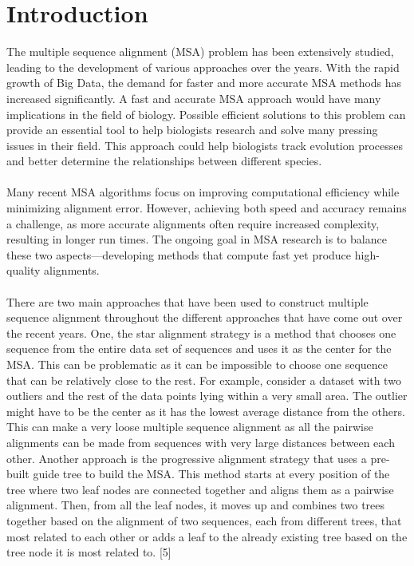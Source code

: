 \section{Introduction}
\label{sec:introduction}
The multiple sequence alignment (MSA) problem has been extensively studied, leading to the development of various approaches over the years. With the rapid growth of Big Data, the demand for faster and more accurate MSA methods has increased significantly. A fast and accurate MSA approach would have many implications in the field of biology. Possible efficient solutions to this problem can provide an essential tool to help biologists research and solve many pressing issues in their field. This approach could help biologists track evolution processes and better determine the relationships between different species.\\
\\Many recent MSA algorithms focus on improving computational efficiency while minimizing alignment error. However, achieving both speed and accuracy remains a challenge, as more accurate alignments often require increased complexity, resulting in longer run times. The ongoing goal in MSA research is to balance these two aspects—developing methods that compute fast yet produce high-quality alignments. \\
\\There are two main approaches that have been used to construct multiple sequence alignment throughout the different approaches that have come out over the recent years. One, the star alignment strategy is a method that chooses one sequence from the entire data set of sequences and uses it as the center for the MSA. This can be problematic as it can be impossible to choose one sequence that can be relatively close to the rest. For example, consider a dataset with two outliers and the rest of the data points lying within a very small area. The outlier might have to be the center as it has the lowest average distance from the others. This can make a very loose multiple sequence alignment as all the pairwise alignments can be made from sequences with very large distances between each other. Another approach is the progressive alignment strategy that uses a pre-built guide tree to build the MSA. This method starts at every position of the tree where two leaf nodes are connected together and aligns them as a pairwise alignment. Then, from all the leaf nodes, it moves up and combines two trees together based on the alignment of two sequences, each from different trees, that most related to each other or adds a leaf to the already existing tree based on the tree node it is most related to. [5] \\
